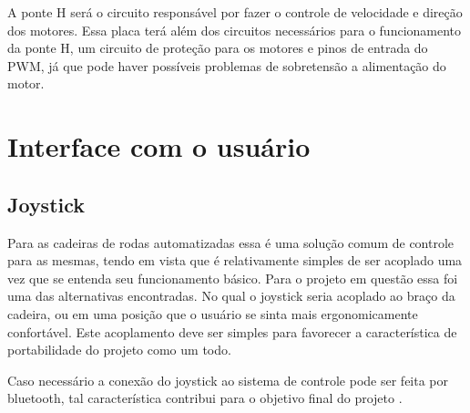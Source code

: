 A ponte H será o circuito responsável por fazer o controle de velocidade e direção dos motores. Essa placa terá além dos circuitos necessários para o funcionamento da ponte H, um circuito de proteção para os motores e pinos de entrada do PWM, já que pode haver possíveis problemas de sobretensão a alimentação do motor.

\section{Interface com o usuário}

\subsection{Joystick}

Para as cadeiras de rodas automatizadas essa é uma solução comum de controle para as mesmas, tendo em vista que é relativamente simples de ser acoplado uma vez que se entenda seu funcionamento básico. Para o projeto em questão essa foi uma das alternativas encontradas. No qual o joystick seria acoplado ao braço da cadeira, ou em uma posição que o usuário se sinta mais ergonomicamente confortável. Este acoplamento deve ser simples para favorecer a característica de portabilidade do projeto como um todo.

Caso necessário a conexão do joystick ao sistema de controle pode ser feita por bluetooth, tal característica contribui para o objetivo final do projeto \cite{artigo_joystick_controller}.
